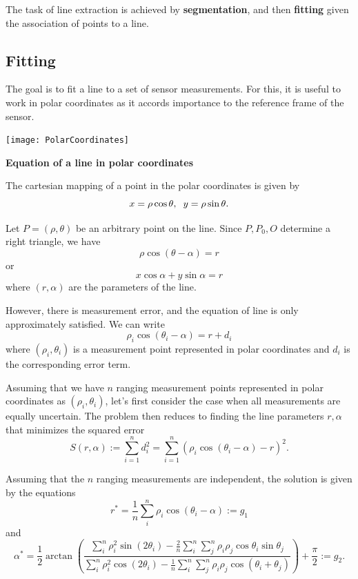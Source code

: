 \documentclass[twoside]{article}
\begin{document}
The task of line extraction is achieved by \textbf{segmentation}, and then \textbf{fitting} given the association of points to a line.

\subsection{Fitting}
The goal is to fit a line to a set of sensor measurements. For this, it is useful to work in polar coordinates as it accords importance to the reference frame of the sensor.

\begin{center}
	\texttt{[image: PolarCoordinates]}
\end{center}

\textbf{Equation of a line in polar coordinates}

The cartesian mapping of a point in the polar coordinates is given by
$$x = \rho \cos \theta, \hspace{2mm} y = \rho \sin \theta.$$

Let $P = (\rho, \theta)$ be an arbitrary point on the line. Since $P, P_0, O$ determine a right triangle, we have
$$\rho \cos(\theta - \alpha) = r$$
or
$$x \cos \alpha + y \sin \alpha = r$$
where $(r,\alpha)$ are the parameters of the line.

However, there is measurement error, and the equation of line is only approximately satisfied. We can write
$$\rho_i \cos(\theta_i - \alpha) = r + d_i$$
where $(\rho_i, \theta_i)$ is a measurement point represented in polar coordinates and $d_i$ is the corresponding error term.

Assuming that we have $n$ ranging measurement points represented in polar coordinates as $(\rho_i, \theta_i)$, let's first consider the case when all measurements are equally uncertain. The problem then reduces to finding the line parameters $r,\alpha$ that minimizes the squared error
$$S(r,\alpha) := \sum_{i=1}^n d_i^2 = \sum_{i=1}^n(\rho_i \cos(\theta_i - \alpha) - r)^2.$$

Assuming that the $n$ ranging measurements are independent, the solution is given by the equations
$$r^* = \frac{1}{n}\sum_i^n \rho_i\cos(\theta_i - \alpha) := g_1$$ and
$$\alpha^* = \frac{1}{2} \arctan\left(\frac{\sum_i^n \rho_i^2\sin(2\theta_i) - \frac{2}{n}\sum_i^n\sum_j^n \rho_i \rho_j \cos\theta_i \sin \theta_j}{\sum_i^n \rho_i^2\cos(2\theta_i) - \frac{1}{n}\sum_i^n\sum_j^n \rho_i \rho_j \cos(\theta_i + \theta_j)}\right) + \frac{\pi}{2} := g_2.$$
\end{document}
